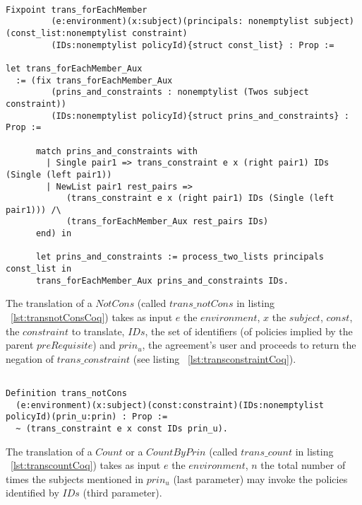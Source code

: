 \begin{minipage}[c]{0.95\textwidth}
\begin{lstlisting}

Fixpoint trans_forEachMember
         (e:environment)(x:subject)(principals: nonemptylist subject)(const_list:nonemptylist constraint)
         (IDs:nonemptylist policyId){struct const_list} : Prop := 

let trans_forEachMember_Aux   
  := (fix trans_forEachMember_Aux
         (prins_and_constraints : nonemptylist (Twos subject constraint))
         (IDs:nonemptylist policyId){struct prins_and_constraints} : Prop :=

      match prins_and_constraints with
        | Single pair1 => trans_constraint e x (right pair1) IDs (Single (left pair1)) 
        | NewList pair1 rest_pairs =>
            (trans_constraint e x (right pair1) IDs (Single (left pair1))) /\
            (trans_forEachMember_Aux rest_pairs IDs)
      end) in

      let prins_and_constraints := process_two_lists principals const_list in
      trans_forEachMember_Aux prins_and_constraints IDs.

\end{lstlisting}
\end{minipage}

The translation of a $NotCons$ (called $trans\_notCons$ in listing ~\ref{lst:transnotConsCoq}) takes as input $e$ the $environment$, $x$ the $subject$, $const$, the $constraint$ to translate, $IDs$, the set of identifiers (of policies implied by the parent $preRequisite$) and $prin_{u}$, the agreement's user and proceeds to return the negation of $trans\_constraint$ (see listing ~\ref{lst:transconstraintCoq}).


\begin{lstlisting}

Definition trans_notCons
  (e:environment)(x:subject)(const:constraint)(IDs:nonemptylist policyId)(prin_u:prin) : Prop :=
  ~ (trans_constraint e x const IDs prin_u).
\end{lstlisting}




The translation of a $Count$ or a $CountByPrin$ (called $trans\_count$ in listing ~\ref{lst:transcountCoq}) takes as input $e$ the $environment$, $n$ the total number of times the subjects mentioned in $prin_{u}$ (last parameter) may invoke the policies identified by $IDs$ (third parameter).

